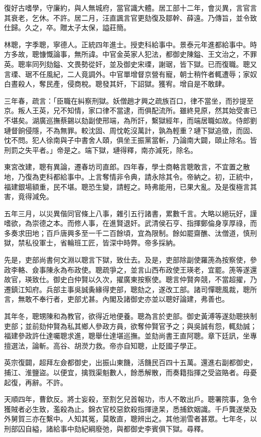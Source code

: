 \begin{pinyinscope}
復好古嗜學，守廉約，與人無城府，當官識大體。居工部十二年，會災異，言官言其衰老，乞休。不許。居二月，汪直諷言官更劾復及鄒幹、薛遠。乃傳旨，並令致仕歸。久之，卒。贈太子太保，謚莊簡。

林聰，字季聰，寧德人。正統四年進士。授吏科給事中。景泰元年進都給事中。時方多故，聰慷慨論事，無所諱。中官金英家人犯法，都御史陳鎰、王文治之，不罪英。聰率同列劾鎰、文畏勢從奸，並及御史宋瑮，謝琚，皆下獄。已而復職。聰又言瑮、琚不任風紀，二人竟調外。中官單增督京營有寵，朝士稍忤者輒遭辱；家奴白晝殺人，奪民產，侵商稅。聰發其奸，下詔獄。獲宥。增自是不敢肆。

三年春，疏言：「臣職在糾察刑獄。妖僧趙才興之疏族百口，律不當坐，而抄提至京。叛人王英，兄不知情，家口律不當逮，而俱配流所。雖終見原，然其始受害已不堪矣。湖廣巡撫蔡錫以劾副使邢端，為所訐，繫獄經年，而端居職如故。侍郎劉璉督餉侵隱，不為無罪。較沈固、周忱乾沒萬計，孰為輕重？璉下獄追徵，而固、忱不問。犯人徐南與子中書舍人頤，俱坐王振黨當斬，乃論南大闢，頤止除名。皆刑罰之失平者。」帝是之。端下獄，璉得釋，南亦減死，除名。

東宮改建，聰有異論，遷春坊司直郎。四年春，學士商輅言聰敢言，不宜置之散地，乃復為吏科都給事中。上言奪情非令典，請永除其令。帝納之。初，正統中，福建銀場額重，民不堪。聰恐生變，請輕之。時弗能用，已果大亂。及是復極言其害，竟得減免。

五年三月，以災異偕同官條上八事，雜引五行諸書，累數千言。大略以絕玩好，謹嗜欲，為崇德之本。而修人事，在進賢退奸。武清侯石亨、指揮鄭倫身享厚祿，而多奏求田地；百戶唐興多至一千二百餘頃，宜為限制。餘如罷齋醮、汰僧道，慎刑獄，禁私役軍士，省輪班工匠，皆深中時弊。帝多採納。

先是，吏部尚書何文淵以聰言下獄，致仕去。及是，吏部除副使羅箎為按察使，參政李輅、僉事陳永為布政使。聰疏爭之，並言山西布政使王瑛老，宜罷。箎等遂還故官，瑛致仕。御史白仲賢以久次，擢廣東按察使。聰言仲賢奔競，不當超擢，乃遷鎮江知府。兵部主事吳誠夤緣得吏部，聰劾之，遂改工部。諸司憚聰風裁，聰所言，無敢不奉行者，吏部尤甚。內閣及諸御史亦並以聰好論建，弗善也。

其年冬，聰甥陳和為教官，欲得近地便養。聰為言於吏部。御史黃溥等遂劾聰挾制吏部；並前劾仲賢為私其鄉人參政方員，欲奪仲賢官予之；與吳誠有怨，輒劾誠；福建參政許仕達囑聰求進，聰舉仕達堪巡撫。並劾尚書王直阿聰。章下廷訊，坐專擅選法，論斬。高谷、胡濙力救。帝亦自知聰，止貶國子學正。

英宗復闢，超拜左僉都御史，出振山東饑，活饑民百四十五萬。還進右副都御史，捕江、淮鹽盜。以便宜，擒戮渠魁數人，餘悉解散，而奏籍指揮之受盜賂者。母憂起復，再辭。不許。

天順四年，曹欽反。將士妄殺，至割乞兒首報功，市人不敢出戶。聰署院事，急令獲賊者必生致，濫殺為止。錦衣官校惡欽殺指揮逯杲，悉捕欽姻識。千戶龔遂榮及外舅賀三亦在繫中。人知其冤，莫敢直，聰辨出之。其他湔雪者甚眾。七年冬，以刑部囚自縊，諸給事中劾紀綱廢弛，與都御史李賓俱下獄。尋釋。


\end{pinyinscope}
